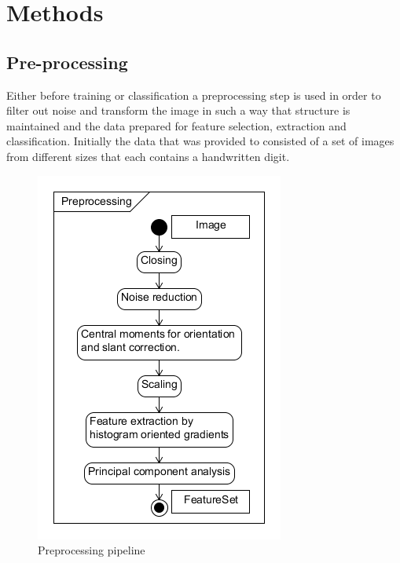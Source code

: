 \documentclass[%
        compressed,
        final,
        notitlepage,
        narroweqnarray,
        inline,
        twoside,
        ]{ieee}
\begin{document}
\section{Methods}

\subsection{Pre-processing}
Either before training or classification a preprocessing step is used in order to filter out noise and transform the image in such a way that structure is maintained and the data prepared for feature selection, extraction and classification. Initially the data that was provided to consisted of a set of images from different sizes that each contains a handwritten digit.

\begin{figure}
    \centering
    \includegraphics[width=\columnwidth]{preprocessing2.png}
    \caption{Preprocessing pipeline}
    \label{fig:preprocessing}
\end{figure}
\end{document}
